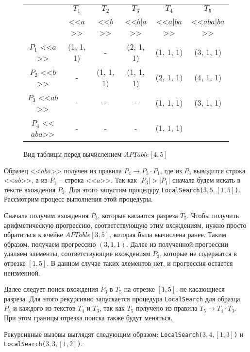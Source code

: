 \documentclass[14pt]{article}
\begin{document}
\begin{figure}
    \begin{center}
        \begin{tabular}{ | c | c | c | c | c | c |}

        \hline
              & $T_1$ & $T_2$ & $T_3$ & $T_4$ & $T_5$ \\
              & <<$a$>> & <<$b$>> & <<$b|a$>> & <<$a|ba$>> & <<$aba|ba$>> \\      
        \hline
        $P_1$ <<$a$>> & (1, 1, 1) & - & (2, 1, 1) & (1, 1, 1) & (3, 1, 1) \\
        \hline
        $P_2$ <<$b$>> & - & (1, 1, 1) & (1, 1, 1) & (2, 1, 1) & (4, 1, 1) \\
        \hline
        $P_3$ <<$ab$>> & - & - & - & (1, 1, 1) & (3, 1, 1)\\
        \hline
        $P_4$ <<$aba$>> & - & - & - & (1, 1, 1) & \\
        \hline
        \end{tabular}
    \end{center}
    \caption{Вид таблицы перед вычислением $APTable[4, 5]$}
    \label{ex2}
\end{figure}

Образец <<$aba$>> получен из правила $P_4 \to P_3\cdot P_1$, где из $P_3$ выводится строка <<$ab$>>,
а из $P_1$ -- строка <<$a$>>. Так как $|P_3| > |P_1|$ сначала будем искать в тексте вхождения $P_3$.
Для этого запустим процедуру \texttt{LocalSearch($3, 5, [1, 5]$)}.
Рассмотрим процесс выполнения этой процедуры.

Сначала получим вхождения $P_3$, которые касаются разреза $T_5$. Чтобы получить арифметическую прогрессию, соответствующую этим вхождениям, нужно просто обратиться к ячейке $APTable[3, 5]$, которая была вычислена ранее. Таким образом, получаем прогрессию $(3, 1, 1)$. Далее из полученной прогрессии удаляем элементы, соответствующие вхождениям $P_3$, которые не содержатся в отрезке $[1, 5]$. 
В данном случае таких элементов нет, и прогрессия остается неизменной.

Далее следует поиск вхождения $P_3$ в $T_5$ на отрезке $[1, 5]$, не касающиеся разреза.
Для этого рекурсивно запускается процедура \texttt{LocalSearch} для образца $P_3$ и каждого из текстов $T_4$ и $T_3$, так как $T_5$ получено из правила $T_5 \to T_4\cdot T_3$. При этом границы отрезка поиска также будут меняться.

Рекурсивные вызовы выглядят следующим образом: \texttt{LocalSearch($3, 4, [1, 3]$)} и 
\texttt{LocalSearch($3, 3, [1, 2]$)}.
\end{document}
